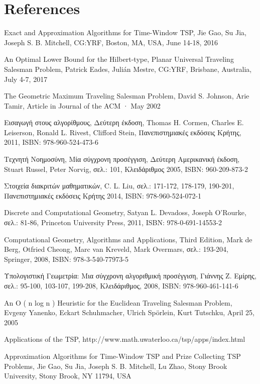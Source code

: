 \documentclass[oneside,12pt]{book}
\theoremstyle{definition}
\begin{document}
\chapter{References}
\begin{thebibliography}{depth}
	Exact and Approximation Algorithms for Time-Window TSP, 
	Jie Gao, Su Jia, Joseph S. B. Mitchell,
	CG:YRF, Boston, MA, USA, June 14-18, 2016
	
	An Optimal Lower Bound for the Hilbert-type, Planar Universal Traveling Salesman Problem, 
	Patrick Eades, Julián Mestre,
	CG:YRF, Brisbane, Australia, July 4-7, 2017
	
	The Geometric Maximum Traveling Salesman Problem, 
	David S. Johnson, Arie Tamir,
	Article in Journal of the ACM · May 2002
	
	Εισαγωγή στους αλγορίθμους, Δεύτερη έκδοση, 
	Thomas H. Cormen, Charles E. Leiserson, Ronald L. Rivest, Clifford Stein,
	Πανεπιστημιακές εκδόσεις Κρήτης, 2011,
	ISBN: 978-960-524-473-6
	
	Τεχνητή Νοημοσύνη, Μία σύγχρονη προσέγγιση, Δεύτερη Αμερικανική έκδοση, 
	Stuart Russel, Peter Norvig,
	σελ.: 101,
	Κλειδάριθμος 2005,
	ISBN: 960-209-873-2
	
	Στοιχεία διακριτών μαθηματικών, 
	C. L. Liu,
	σελ.: 171-172, 178-179, 190-201,
	Πανεπιστημιακές εκδόσεις Κρήτης 2014, 
	ISBN: 978-960-524-072-1	
	
	Discrete and Computational Geometry, 
	Satyan L. Devadoss, Joseph O'Rourke,
	σελ.: 81-86,
	Princeton University Press, 2011, 
	ISBN: 978-0-691-14553-2
	
	Computational Geometry,	Algorithms and Applications, Third Edition, 
	Mark de Berg, Otfried Cheong, Marc van Kreveld, Mark Overmars,
	σελ.: 193-204,
	Springer, 2008, 
	ISBN: 978-3-540-77973-5
	
	Υπολογιστική Γεωμετρία: Μια σύγχρονη αλγοριθμική προσέγγιση, 
	Γιάννης Ζ. Εμίρης,
	σελ.: 95-100, 103-107, 199-208,
	Κλειδάριθμος, 2008, 
	ISBN: 978-960-461-141-6 
	
	An O ( n log n ) Heuristic for the Euclidean Traveling Salesman Problem, 
	Evgeny Yanenko, Eckart
	Schuhmacher, Ulrich Spörlein, Kurt Tutschku,
	April 25, 2005
	
	Applications of the TSP,
	http://www.math.uwaterloo.ca/tsp/apps/index.html
	
	Approximation Algorithms for Time-Window
	TSP and Prize Collecting TSP Problems,
	Jie Gao, Su Jia, Joseph S. B. Mitchell, Lu Zhao,
	Stony Brook University, Stony Brook, NY 11794, USA
	

\end{thebibliography}
\end{document}
